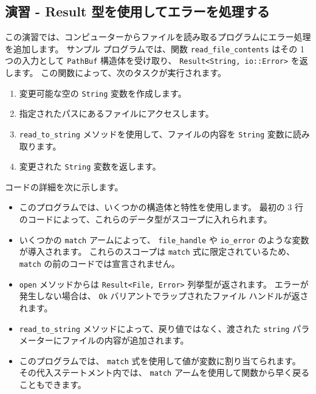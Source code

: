 \subsection{演習 - Result 型を使用してエラーを処理する}

この演習では、コンピューターからファイルを読み取るプログラムにエラー処理を追加します。 サンプル プログラムでは、関数 \texttt{read\_file\_contents} はその 1 つの入力として \texttt{PathBuf} 構造体を受け取り、 \texttt{Result<String, io::Error>} を返します。 この関数によって、次のタスクが実行されます。

\begin{enumerate}

\item 変更可能な空の \texttt{String} 変数を作成します。
\item 指定されたパスにあるファイルにアクセスします。
\item \texttt{read_to_string} メソッドを使用して、ファイルの内容を \texttt{String} 変数に読み取ります。
\item 変更された \texttt{String} 変数を返します。

\end{enumerate}

コードの詳細を次に示します。

\begin{itemize}

\item このプログラムでは、いくつかの構造体と特性を使用します。 最初の 3 行のコードによって、これらのデータ型がスコープに入れられます。
\item いくつかの \texttt{match} アームによって、 \texttt{file\_handle} や \texttt{io\_error} のような変数が導入されます。 これらのスコープは \texttt{match} 式に限定されているため、 \texttt{match} の前のコードでは宣言されません。
\item \texttt{open} メソッドからは \texttt{Result<File, Error>} 列挙型が返されます。 エラーが発生しない場合は、 \texttt{Ok} バリアントでラップされたファイル ハンドルが返されます。
\item \texttt{read\_to\_string} メソッドによって、戻り値ではなく、渡された \texttt{string} パラメーターにファイルの内容が追加されます。
\item このプログラムでは、 \texttt{match} 式を使用して値が変数に割り当てられます。 その代入ステートメント内では、 \texttt{match} アームを使用して関数から早く戻ることもできます。

\end{itemize}

